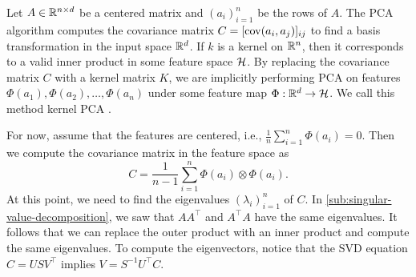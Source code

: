 Let \(A \in \mathbb{R}^{n \times d}\) be a centered matrix and \((a_i)_{i=1}^n\) be the rows of \(A\).
The PCA algorithm computes the covariance matrix \(C = [\operatorname{cov}(a_i,a_j)]_{ij}\) to find a basis transformation in the input space \(\mathbb{R}^d\).
If \(k\) is a kernel on \(\mathbb{R}^n\), then it corresponds to a valid inner product in some feature space \(\mathcal{H}\).
By replacing the covariance matrix \(C\) with a kernel matrix \(K\), we are implicitly performing PCA on features \(\Phi(a_1), \Phi(a_2), \dots, \Phi(a_n)\) under some feature map \(\Phi : \mathbb{R}^d \to \mathcal{H}\).
We call this method kernel PCA \cite{scholkopf1998nonlinear}.

For now, assume that the features are centered, i.e., \(\frac{1}{n}\sum_{i=1}^{n} \Phi(a_i) = 0\).
Then we compute the covariance matrix in the feature space as
\begin{equation}
    C = \frac{1}{n-1} \sum_{i=1}^{n} \Phi(a_i) \otimes \Phi(a_i).
\end{equation}
At this point, we need to find the eigenvalues \((\lambda_i)_{i=1}^n\) of \(C\).
In \cref{sub:singular-value-decomposition}, we saw that \(AA^\top\) and \(A^\top A\) have the same eigenvalues.
It follows that we can replace the outer product with an inner product and compute the same eigenvalues.
To compute the eigenvectors, notice that the SVD equation \(C = USV^\top\) implies \(V = S^{-1} U^\top C\).